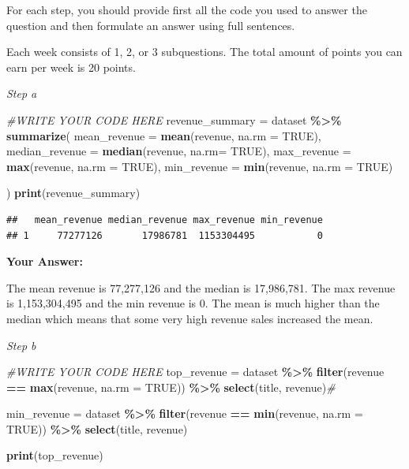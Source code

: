\documentclass[
]{article}
\newenvironment{Shaded}{\begin{snugshade}}{\end{snugshade}}
\newcommand{\AttributeTok}[1]{\textcolor[rgb]{0.13,0.29,0.53}{#1}}
\newcommand{\CommentTok}[1]{\textcolor[rgb]{0.56,0.35,0.01}{\textit{#1}}}
\newcommand{\ConstantTok}[1]{\textcolor[rgb]{0.56,0.35,0.01}{#1}}
\newcommand{\FunctionTok}[1]{\textcolor[rgb]{0.13,0.29,0.53}{\textbf{#1}}}
\newcommand{\NormalTok}[1]{#1}
\newcommand{\OtherTok}[1]{\textcolor[rgb]{0.56,0.35,0.01}{#1}}
\newcommand{\SpecialCharTok}[1]{\textcolor[rgb]{0.81,0.36,0.00}{\textbf{#1}}}
\begin{document}
For each step, you should provide first all the code you used to answer
the question and then formulate an answer using full sentences.

Each week consists of 1, 2, or 3 subquestions. The total amount of
points you can earn per week is 20 points.

\emph{Step a}

\begin{Shaded}
\begin{Highlighting}[]
\CommentTok{\#WRITE YOUR CODE HERE}
\NormalTok{revenue\_summary }\OtherTok{=}\NormalTok{ dataset }\SpecialCharTok{\%\textgreater{}\%}
  \FunctionTok{summarize}\NormalTok{(}
    \AttributeTok{mean\_revenue =} \FunctionTok{mean}\NormalTok{(revenue, }\AttributeTok{na.rm =} \ConstantTok{TRUE}\NormalTok{),}
    \AttributeTok{median\_revenue =} \FunctionTok{median}\NormalTok{(revenue, }\AttributeTok{na.rm=} \ConstantTok{TRUE}\NormalTok{),}
    \AttributeTok{max\_revenue =} \FunctionTok{max}\NormalTok{(revenue, }\AttributeTok{na.rm =} \ConstantTok{TRUE}\NormalTok{),}
    \AttributeTok{min\_revenue =} \FunctionTok{min}\NormalTok{(revenue, }\AttributeTok{na.rm =} \ConstantTok{TRUE}\NormalTok{)}
    
\NormalTok{  )}
    \FunctionTok{print}\NormalTok{(revenue\_summary)}
\end{Highlighting}
\end{Shaded}

\begin{verbatim}
##   mean_revenue median_revenue max_revenue min_revenue
## 1     77277126       17986781  1153304495           0
\end{verbatim}

\textbf{Your Answer:}

The mean revenue is 77,277,126 and the median is 17,986,781. The max
revenue is 1,153,304,495 and the min revenue is 0. The mean is much
higher than the median which means that some very high revenue sales
increased the mean.

\emph{Step b}

\begin{Shaded}
\begin{Highlighting}[]
\CommentTok{\#WRITE YOUR CODE HERE}
\NormalTok{top\_revenue }\OtherTok{=}\NormalTok{ dataset }\SpecialCharTok{\%\textgreater{}\%}
  \FunctionTok{filter}\NormalTok{(revenue }\SpecialCharTok{==} \FunctionTok{max}\NormalTok{(revenue, }\AttributeTok{na.rm =} \ConstantTok{TRUE}\NormalTok{)) }\SpecialCharTok{\%\textgreater{}\%}
  \FunctionTok{select}\NormalTok{(title, revenue)}\CommentTok{\#}

\NormalTok{min\_revenue }\OtherTok{=}\NormalTok{ dataset }\SpecialCharTok{\%\textgreater{}\%}
  \FunctionTok{filter}\NormalTok{(revenue }\SpecialCharTok{==} \FunctionTok{min}\NormalTok{(revenue, }\AttributeTok{na.rm =} \ConstantTok{TRUE}\NormalTok{)) }\SpecialCharTok{\%\textgreater{}\%}
  \FunctionTok{select}\NormalTok{(title, revenue) }

\FunctionTok{print}\NormalTok{(top\_revenue)}
\end{Highlighting}
\end{Shaded}
\end{document}
